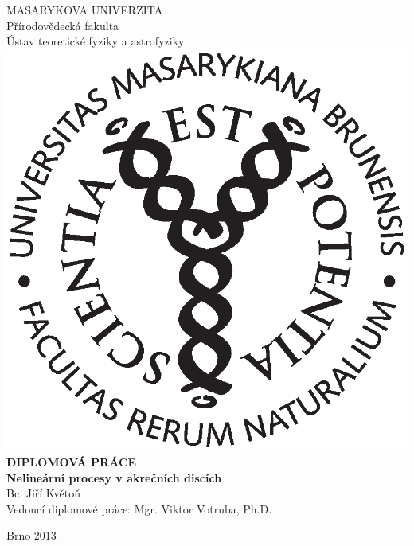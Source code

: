 \documentclass[12pt,notitlepage]{report}
\begin{document}
%
%
\begin{titlepage}
\begin{center}


{\Large MASARYKOVA UNIVERZITA}\\
\vspace{3mm}
{Přírodovědecká fakulta}\\
{Ústav teoretické fyziky a astrofyziky}\\
\vspace{10mm}
\includegraphics[scale=0.4]{logo.eps}\\
\vspace{10mm}
{\Large\bf DIPLOMOVÁ PRÁCE}\\
\vspace{3mm}
{\bf Nelineární procesy v akrečních discích}\\
\vspace{25mm}
{\Large Bc. Jiří Květoň}\\
\vspace{25mm}
\large
\noindent Vedoucí diplomové práce: Mgr. Viktor Votruba, Ph.D.

\vspace{25mm}

Brno 2013
\end{center}

\end{titlepage}
\end{document}
